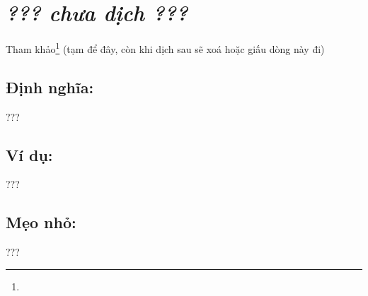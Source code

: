 \section*{\huge \textcolor{Red}{}  \small \textit{??? chưa dịch ???} }
Tham khảo\footnote{} (tạm để đây, còn khi dịch sau sẽ xoá hoặc giấu dòng này đi)
\subsection*{Định nghĩa:}
???
\subsection*{Ví dụ:}
???
\subsection*{Mẹo nhỏ:}
???
